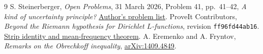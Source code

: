\documentclass[11pt]{article}
\begin{document}
\begin{thebibliography}{9}
 S. Steinerberger, \emph{Open Problems}, 31 March 2026, Problem 41, pp.~41--42, \emph{A kind of uncertainty principle?}
\href{https://faculty.washington.edu/steinerb/openproblems.pdf}{Author's problem list}.
 ProveIt Contributors, \emph{Beyond the Riemann hypothesis for Dirichlet $L$-functions}, revision \texttt{ff96fd44ab16}.
\href{https://github.com/VladimirReshetnikov/ProveIt/blob/ff96fd44ab160e65fb8a9d861243828d07c156cf/Analysis/GeneralizedRiemannHypothesis/Article/sections/fil.tex\#L223-L289}{Strip identity and mean-frequency theorem}.
 A. Eremenko and A. Fryntov, \emph{Remarks on the Obrechkoff inequality}, \href{https://arxiv.org/abs/1409.4849}{arXiv:1409.4849}.
\end{thebibliography}
\end{document}
